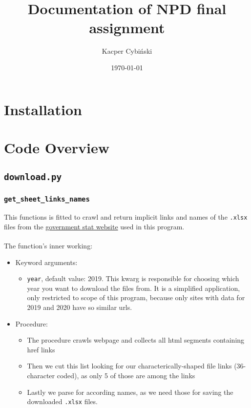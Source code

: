 \documentclass[12pt,a4paper]{article}
\title{Documentation of NPD final assignment}
\author{Kacper Cybiński}
\date{\today}
\begin{document}
\maketitle

\section{Installation}

\section{Code Overview}

\subsection{\texttt{download.py}}
\subsubsection{\texttt{get\_sheet\_links\_names}}
This functions is fitted to crawl and return implicit links and names of the \verb|.xlsx| files from the  \href{https://www.gov.pl/web/finanse/udzialy-za-2020-r}{government stat website} used in this program.\\ \\
The function's inner working:
\begin{itemize}
    \item Keyword arguments:
    \begin{itemize}
        \item \verb|year|, default value: 2019. This kwarg is responsible for choosing which year you want to download the files from. It is a simplified application, only restricted to scope of this program, because only sites with data for 2019 and 2020 have so similar urls.
    \end{itemize}
    \item Procedure:
    \begin{itemize}
        \item The procedure crawls webpage and collects all html segments containing href links
        \item Then we cut this list looking for our characterically-shaped file links (36-character coded), as only 5 of those are among the links
        \item Lastly we parse for according names, as we need those for saving the downloaded \verb|.xlsx| files.
    \end{itemize}
\end{itemize}
\end{document}
